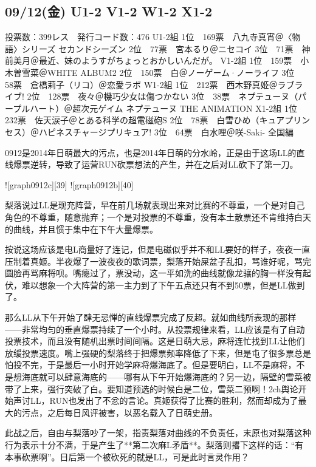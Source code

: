 \subsection{09/12(金) U1-2 V1-2 W1-2 X1-2}

    投票数：399レス　発行コード数：476
    U1-2組
    1位　169票　八九寺真宵＠〈物語〉シリーズ セカンドシーズン
    2位　77票　宮本るり＠ニセコイ
    3位　71票　神前美月＠最近、妹のようすがちょっとおかしいんだが。
    V1-2組
    1位　159票　小木曽雪菜＠WHITE ALBUM2
    2位　150票　白＠ノーゲーム·ノーライフ
    3位　58票　倉橋莉子（リコ）＠恋愛ラボ
    W1-2組
    1位　212票　西木野真姫＠ラブライブ!
    2位　128票　夜々＠機巧少女は傷つかない
    3位　38票　ネプテューヌ（パープルハート）＠超次元ゲイム ネプテューヌ THE ANIMATION
    X1-2組
    1位　232票　佐天涙子＠とある科学の超電磁砲S
    2位　78票　白雪ひめ（キュアプリンセス）＠ハピネスチャージプリキュア!
    3位　64票　白水哩＠咲-Saki- 全国編

0912是2014年日萌最大的污点，也是2014年日萌的分水岭，正是由于这场LL的直线爆票逆转，导致了运营RUN砍票想法的产生，并在之后对LL砍下了第一刀。

![graph0912c][39]
![graph0912b][40]

梨落说过LL是现充阵营，早在前几场就表现出来对比赛的不尊重，一个是对自己角色的不尊重，随意抛弃；一个是对投票的不尊重，没有本土散票还不肯维持白天的曲线，并且惯于集中在下午大量爆票。

按说这场应该是电L商量好了连记，但是电磁似乎并不和LL要好的样子，夜夜一直压制着真姬。半夜爆了一波夜夜的歌词票，梨落开始屎盆子乱扣，骂谁好呢，骂完圆脸再骂麻将呗。嘴瘾过了，票没动，这一平如洗的曲线就像龙骧的胸一样没有起伏，难以想象一个大阵营的第一主力到了下午五点还只有不到50票，但是LL做到了。

那么LL从下午开始了肆无忌惮的直线爆票完成了反超。就如曲线所表现的那样——非常均匀的垂直爆票持续了一个小时。从投票规律来看，LL应该是有了自动投票技术，而且没有随机出票时间间隔。这是日萌大忌，麻将连忙找到LL让他们放缓投票速度。嘴上强硬的梨落终于把爆票频率降低了下来，但是屯了很多票总是怕投不完，于是最后一小时开始学麻将爆海底了。但是要明白，LL不是麻将，不是想海底就可以肆意海底的——哪有从下午开始爆海底的？另一边，隔壁的雪菜被带了上来，强行突破了白。要知道预选的时候白是二位，雪菜二预啊！2ch舆论开始声讨LL，RUN也发出了不忿的言论。真姬获得了比赛的胜利，然而却成为了最大的污点，之后每日风评被害，以恶名载入了日萌史册。

此战之后，自由与梨落吵了一架，指责梨落对曲线的不负责任，末原也对梨落这种行为表示十分不满，于是产生了**第二次麻L矛盾**。梨落则撂下这样的话：“有本事砍票啊”。日后第一个被砍死的就是LL，可是此时言灵作用？

